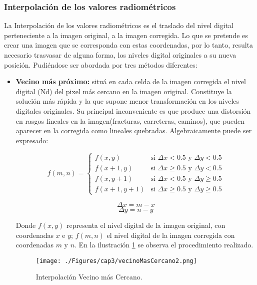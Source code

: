 \subsubsection{Interpolaci\'on de los valores radiom\'etricos}
La Interpolaci\'on de los valores radiom\'etricos es el traslado del nivel digital perteneciente a la imagen original, a la imagen corregida. Lo que se pretende es crear una imagen que se corresponda con estas coordenadas, por lo tanto, resulta necesario trasvasar de alguna forma, los niveles digital originales a su nueva posici\'on. Pudi\'endose ser abordada por tres m\'etodos diferentes:
	\begin{itemize}
		\item \textbf{Vecino m\'as pr\'oximo:} situ\'a en cada celda de la imagen corregida el nivel digital (Nd) del pixel m\'as cercano en la imagen original. Constituye la soluci\'on m\'as r\'apida y la que supone menor transformaci\'on en los niveles digitales originales. Su principal inconveniente es que produce una distorsi\'on en rasgos lineales en la imagen(fracturas, carreteras, caminos), que pueden aparecer en la corregida como lineales quebradas. Algebraicamente puede ser expresado:
		
\begin{equation}
	f(m,n) = \begin{cases}
		f(x,y) & \text{si }\Delta x < 0.5 \text{ y } \Delta y < 0.5\\
		f(x+1,y) & \text{si } \Delta x \geq 0.5 \text{ y } \Delta y < 0.5\\
		f(x,y+1) & \text{si } \Delta x < 0.5 \text{ y } \Delta y \geq 0.5\\
		f(x+1,y+1) & \text{si } \Delta x \geq 0.5 \text{ y } \Delta y \geq 0.5
	\end{cases}
\end{equation}	

\begin{equation}
	\Delta x = m-x
\end{equation}	
\begin{equation}
	\Delta y = n-y
\end{equation}	

		Donde $ f(x,y) $ representa el nivel digital de la imagen original, con coordenadas $ x $ e $ y  $;  $ f(m,n) $ el nivel digital de la imagen corregida con coordenadas $ m $ y $ n $. En la ilustraci\'on \ref{fig:vecinoMasCercano2} se observa el procedimiento realizado.
				    \begin{figure}[H]
				    	\centering
				    	\texttt{[image: ./Figures/cap3/vecinoMasCercano2.png]}
				    	\caption{Interpolaci\'on Vecino m\'as Cercano.}
				    	\label{fig:vecinoMasCercano2}
				    \end{figure}
		

\end{itemize}
